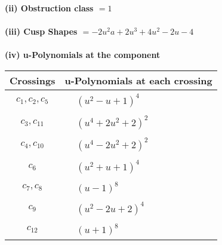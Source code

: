 \documentclass[1p]{elsarticle_modified}
\theoremstyle{definition}
\begin{document}
\flushleft \textbf{(ii) Obstruction class $= 1$}\\~\\
\flushleft \textbf{(iii) Cusp Shapes $= -2 u^2 a+2 u^3+4 u^2-2 u-4$}\\~\\
\newpage\renewcommand{\arraystretch}{1}
\flushleft \textbf{(iv) u-Polynomials at the component}\newline \\
\begin{tabular}{m{50pt}|m{274pt}}
Crossings & \hspace{64pt}u-Polynomials at each crossing \\
\hline $$\begin{aligned}c_{1},c_{2},c_{5}\end{aligned}$$&$\begin{aligned}
&(u^2- u+1)^4
\end{aligned}$\\
\hline $$\begin{aligned}c_{3},c_{11}\end{aligned}$$&$\begin{aligned}
&(u^4+2 u^2+2)^2
\end{aligned}$\\
\hline $$\begin{aligned}c_{4},c_{10}\end{aligned}$$&$\begin{aligned}
&(u^4-2 u^2+2)^2
\end{aligned}$\\
\hline $$\begin{aligned}c_{6}\end{aligned}$$&$\begin{aligned}
&(u^2+u+1)^4
\end{aligned}$\\
\hline $$\begin{aligned}c_{7},c_{8}\end{aligned}$$&$\begin{aligned}
&(u-1)^8
\end{aligned}$\\
\hline $$\begin{aligned}c_{9}\end{aligned}$$&$\begin{aligned}
&(u^2-2 u+2)^4
\end{aligned}$\\
\hline $$\begin{aligned}c_{12}\end{aligned}$$&$\begin{aligned}
&(u+1)^8
\end{aligned}$\\
\hline
\end{tabular}\\~\\
\end{document}

